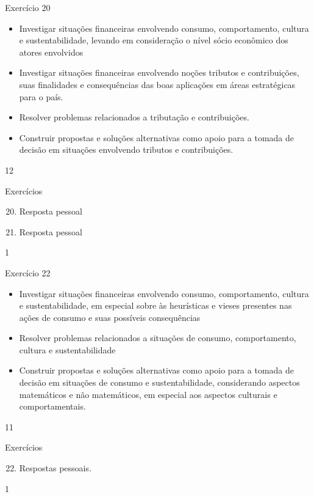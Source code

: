 \begin{objectives}{Exercício 20}
{
  \begin{itemize}
  \item Investigar situações financeiras envolvendo consumo, comportamento, cultura e sustentabilidade, levando em consideração o nível sócio econômico dos atores envolvidos
  \end{itemize}

  \begin{itemize}
  \item Investigar situações financeiras envolvendo noções tributos e contribuições, suas finalidades e consequências das boas aplicações em áreas estratégicas para o país.
  \item Resolver problemas relacionados a tributação e contribuições.
  \item Construir propostas e soluções alternativas como apoio para a tomada de decisão em situações envolvendo tributos e contribuições.
  \end{itemize}
}{1}{2}
\end{objectives}
\begin{answer}{Exercícios}
{\exerciselist

  \begin{enumerate}\setcounter{enumi}{19}
    \item Resposta pessoal
    \item Resposta pessoal
  \end{enumerate}
}{1}
\end{answer}
\clearmargin

\begin{objectives}{Exercício 22}
{
  \begin{itemize}
  \item Investigar situações financeiras envolvendo consumo, comportamento, cultura e sustentabilidade, em especial sobre às heurísticas e vieses presentes nas ações de consumo e suas possíveis consequências
  \item Resolver problemas relacionados a situações de consumo, comportamento, cultura e sustentabilidade
  \item Construir propostas e soluções alternativas como apoio para a tomada de decisão em situações de consumo e sustentabilidade, considerando aspectos matemáticos e não matemáticos, em especial aos aspectos culturais e comportamentais.
  \end{itemize}
}{1}{1}
\end{objectives}
\begin{answer}{Exercícios}
{\exerciselist

  \begin{enumerate}\setcounter{enumi}{21}
    \item Respostas pessoais.
  \end{enumerate}
}{1}
\end{answer}
\clearmargin


